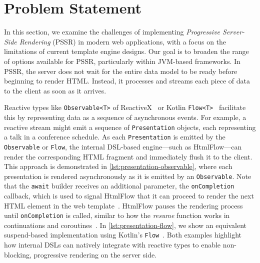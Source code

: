 \section{Problem Statement}

In this section, we examine the challenges of implementing \textit{Progressive
Server-Side Rendering} (PSSR) in modern web applications, with a focus on the
limitations of current template engine designs. Our goal is to broaden the
range of options available for PSSR, particularly within JVM-based frameworks.
In PSSR, the server does not
wait for the entire data model to be ready before beginning to render HTML.
Instead, it processes and streams each piece of data to the client as soon as
it arrives. 

Reactive types like \texttt{Observable<T>} of ReactiveX~\cite{rxjava} or Kotlin \texttt{Flow<T>}~\cite{kotlinlang}
facilitate this by representing data as a sequence of asynchronous events.
For example, a reactive stream might emit a sequence of \texttt{Presentation}
objects, each representing a talk in a conference schedule.
As each \texttt{Presentation} is emitted by the \texttt{Observable}
or \texttt{Flow}, the internal DSL-based engine—such as HtmlFlow—can render the
corresponding HTML fragment and immediately flush it to the client. This
approach is demonstrated in \autoref{lst:presentation-observable}, where each
presentation is rendered asynchronously as it is emitted by an
\texttt{Observable}.
Note that the \texttt{await} builder receives an additional parameter, the
\texttt{onCompletion} callback, which is used to signal HtmlFlow that it can
proceed to render the next HTML element in the web
template~\cite{carvalho2023async}.
HtmlFlow pauses the rendering process until \texttt{onCompletion} is called,
similar to how the \emph{resume} function works in continuations and
coroutines~\cite{coroutines_continuations}.
In \autoref{lst:presentation-flow}, we show an
equivalent suspend-based implementation using Kotlin's \texttt{Flow}~\cite{wise2024pssr}.
Both examples highlight how internal DSLs can natively integrate with reactive types
to enable non-blocking, progressive rendering on the server side.

